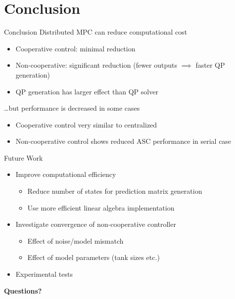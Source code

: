 \printsectiontitlefalse
\section{Conclusion}
\begin{frame}{Conclusion}
    Distributed MPC can \alert{reduce computational cost}\\
      \begin{itemize}
        \item Cooperative control: minimal reduction
        \item Non-cooperative: significant reduction (fewer outputs $\implies$ faster QP generation)
        \item QP generation has larger effect than QP solver
      \end{itemize}
      \vfill

    \ldots but \alert{performance is decreased} in some cases\\
      \begin{itemize}
        \item Cooperative control very similar to centralized
        \item Non-cooperative control shows reduced ASC performance in serial case
      \end{itemize}
\end{frame}

\begin{frame}{Future Work}
  \begin{itemize}
    \item Improve computational efficiency
      \begin{itemize}
        \item Reduce number of states for prediction matrix generation
        \item Use more efficient linear algebra implementation
      \end{itemize}
    \item Investigate convergence of non-cooperative controller
      \begin{itemize}
        \item Effect of noise/model mismatch
        \item Effect of model parameters (tank sizes etc.)
      \end{itemize}
    \item Experimental tests
  \end{itemize}
\end{frame}

\begin{frame}[plain]{}
  \centering\LARGE\bfseries
  Questions?
\end{frame}
